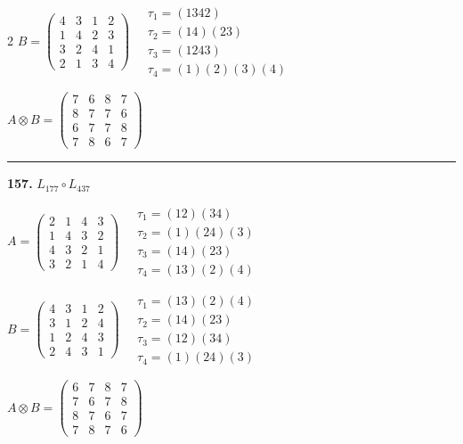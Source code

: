 \begin{multicols}{2}
$B = \begin{pmatrix} 4 & 3 & 1 & 2 \\ 1 & 4 & 2 & 3 \\ 3 & 2 & 4 & 1 \\ 2 & 1 & 3 & 4 \end{pmatrix} \quad \begin{matrix} \tau_{1}=(1 3 4 2) \\ \tau_{2}=(1 4)(2 3) \\ \tau_{3}=(1 2 4 3) \\ \tau_{4}=(1)(2)(3)(4) \end{matrix}$

$A \otimes B = \begin{pmatrix} 7 & 6 & 8 & 7 \\ 8 & 7 & 7 & 6 \\ 6 & 7 & 7 & 8 \\ 7 & 8 & 6 & 7 \end{pmatrix}$

\vspace{0.3em}
\hrule
\vspace{0.3em}

\noindent\textbf{157.} $L_{177} \circ L_{437}$

$A = \begin{pmatrix} 2 & 1 & 4 & 3 \\ 1 & 4 & 3 & 2 \\ 4 & 3 & 2 & 1 \\ 3 & 2 & 1 & 4 \end{pmatrix} \quad \begin{matrix} \tau_{1}=(1 2)(3 4) \\ \tau_{2}=(1)(2 4)(3) \\ \tau_{3}=(1 4)(2 3) \\ \tau_{4}=(1 3)(2)(4) \end{matrix}$

$B = \begin{pmatrix} 4 & 3 & 1 & 2 \\ 3 & 1 & 2 & 4 \\ 1 & 2 & 4 & 3 \\ 2 & 4 & 3 & 1 \end{pmatrix} \quad \begin{matrix} \tau_{1}=(1 3)(2)(4) \\ \tau_{2}=(1 4)(2 3) \\ \tau_{3}=(1 2)(3 4) \\ \tau_{4}=(1)(2 4)(3) \end{matrix}$

$A \otimes B = \begin{pmatrix} 6 & 7 & 8 & 7 \\ 7 & 6 & 7 & 8 \\ 8 & 7 & 6 & 7 \\ 7 & 8 & 7 & 6 \end{pmatrix}$


\end{multicols}

